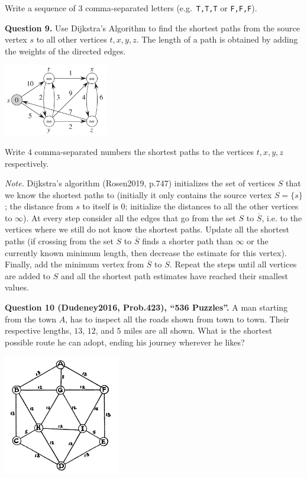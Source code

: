 \documentclass[jou]{apa6}
\begin{document}
Write a sequence of 3 comma-separated letters (e.g.\ {\tt T,T,T} or {\tt F,F,F}).



\vspace{10pt}
{\bf Question 9.}
Use Dijkstra’s Algorithm to find the shortest paths from the source vertex $s$ 
to all other vertices $t,x,y,z$. The length of a path is obtained by adding the 
weights of the directed edges.
\begin{center}
\includegraphics[width=1.8in]{dijkstra.png}
\end{center}

Write $4$ comma-separated numbers \textendash{} the shortest paths 
to the vertices $t,x,y,z$ respectively.

{\em Note.} Dijkstra's algorithm (Rosen2019, p.747) initializes the set of vertices $S$ that we 
know the shortest paths to (initially it only contains the 
source vertex $S = \{ s \}$; 
the distance from $s$ to itself is $0$; initialize the distances to 
all the other vertices to $\infty$). At every step consider all the edges that 
go from the set $S$ to $\overline{S}$, i.e. to the vertices where we still 
do not know the shortest paths. Update all the shortest paths (if crossing from 
the set $S$ to $\overline{S}$ finds a shorter path than $\infty$ or the currently 
known minimum length, then decrease the estimate for this vertex). 
Finally, add the minimum vertex from $\overline{S}$ to $S$. Repeat the steps
until all vertices are added to $S$ and all the shortest path estimates have 
reached their smallest values.





\vspace{10pt}
{\bf Question 10 (Dudeney2016, Prob.423), ``536 Puzzles''.}
A man starting from the town $A$, has to inspect all the roads
shown from town to town. Their respective lengths, $13$, $12$, and $5$
miles are all shown. What is the shortest possible route he can adopt, 
ending his journey wherever he likes?
\begin{center}
\includegraphics[width=2in]{path-with-repetitions.png}
\end{center}
\end{document}
